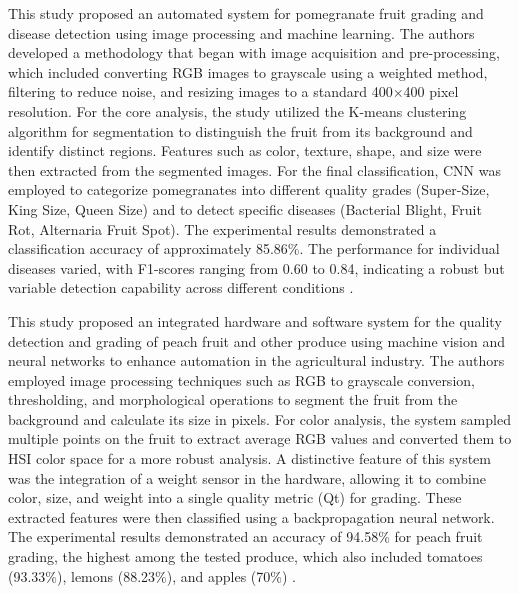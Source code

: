 {

This study proposed an automated system for pomegranate fruit grading and disease detection using image processing and machine learning. The authors developed a methodology that began with image acquisition and pre-processing, which included converting RGB images to grayscale using a weighted method, filtering to reduce noise, and resizing images to a standard 400$\times$400 pixel resolution. For the core analysis, the study utilized the K-means clustering algorithm for segmentation to distinguish the fruit from its background and identify distinct regions. Features such as color, texture, shape, and size were then extracted from the segmented images. For the final classification, CNN was employed to categorize pomegranates into different quality grades (Super-Size, King Size, Queen Size) and to detect specific diseases (Bacterial Blight, Fruit Rot, Alternaria Fruit Spot). The experimental results demonstrated a classification accuracy of approximately 85.86\%. The performance for individual diseases varied, with F1-scores ranging from 0.60 to 0.84, indicating a robust but variable detection capability across different conditions \citep{Kazi2023}.

This study proposed an integrated hardware and software system for the quality detection and grading of peach fruit and other produce using machine vision and neural networks to enhance automation in the agricultural industry. The authors employed image processing techniques such as RGB to grayscale conversion, thresholding, and morphological operations to segment the fruit from the background and calculate its size in pixels. For color analysis, the system sampled multiple points on the fruit to extract average RGB values and converted them to HSI color space for a more robust analysis. A distinctive feature of this system was the integration of a weight sensor in the hardware, allowing it to combine color, size, and weight into a single quality metric (Qt) for grading. These extracted features were then classified using a backpropagation neural network. The experimental results demonstrated an accuracy of 94.58\% for peach fruit grading, the highest among the tested produce, which also included tomatoes (93.33\%), lemons (88.23\%), and apples (70\%) \citep{Luo2024}.


}

